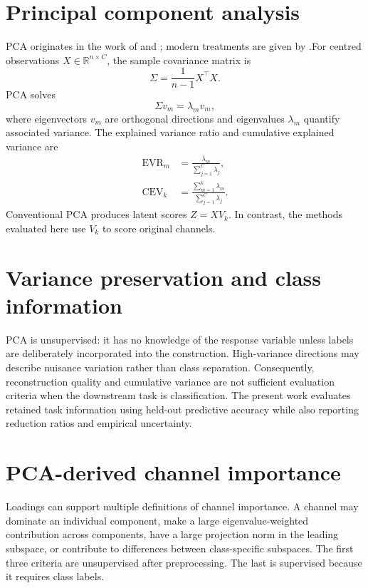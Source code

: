 \section{Principal component analysis}
PCA originates in the work of \citet{pearson1901pca} and
\citet{hotelling1933pca}; modern treatments are given by
\citet{jolliffe2002pca,jolliffe2016pca}.For centred observations $X\in\mathbb{R}^{n\times C}$, the sample covariance matrix is
\begin{equation}
 \Sigma=\frac{1}{n-1}X^\top X.
\end{equation}
PCA solves
\begin{equation}
 \Sigma v_m=\lambda_m v_m,
\end{equation}
where eigenvectors $v_m$ are orthogonal directions and eigenvalues $\lambda_m$ quantify associated variance. The explained variance ratio and cumulative explained variance are
\begin{align}
 \operatorname{EVR}_m &= \frac{\lambda_m}{\sum_{j=1}^{C}\lambda_j},\\
 \operatorname{CEV}_k &= \frac{\sum_{m=1}^{k}\lambda_m}{\sum_{j=1}^{C}\lambda_j}.
\end{align}
Conventional PCA produces latent scores $Z=XV_k$. In contrast, the methods evaluated here use $V_k$ to score original channels.

\section{Variance preservation and class information}
PCA is unsupervised: it has no knowledge of the response variable unless labels are deliberately incorporated into the construction. High-variance directions may describe nuisance variation rather than class separation. Consequently, reconstruction quality and cumulative variance are not sufficient evaluation criteria when the downstream task is classification. The present work evaluates retained task information using held-out predictive accuracy while also reporting reduction ratios and empirical uncertainty.

\section{PCA-derived channel importance}
Loadings can support multiple definitions of channel importance. A channel may dominate an individual component, make a large eigenvalue-weighted contribution across components, have a large projection norm in the leading subspace, or contribute to differences between class-specific subspaces. The first three criteria are unsupervised after preprocessing. The last is supervised because it requires class labels.

